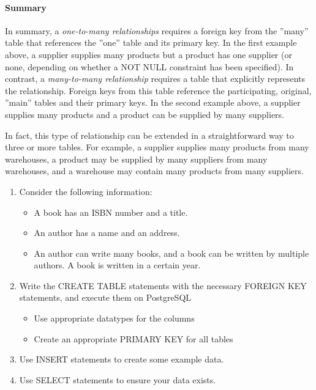 \paragraph*{Summary} In summary, a \emph{one-to-many relationships} requires a foreign key from the ''many'' table that references the ''one'' table and its primary key. In the first example above, a supplier supplies many products but a product has one supplier (or none, depending on whether a NOT NULL constraint has been specified). In contrast, a \emph{many-to-many relationship} requires a table that explicitly represents the relationship. Foreign keys from this table reference the participating, original, ''main'' tables and their primary keys. In the second example above, a supplier supplies many products and a product can be supplied by many suppliers. 

In fact, this type of relationship can be extended in a straightforward way to three or more tables. For example, a supplier supplies many products from many warehouses, a product may be supplied by many suppliers from many warehouses, and a warehouse may contain many products from many suppliers. 

\begin{exercisebox}
\begin{enumerate}
  \item Consider the following information:
	\begin{itemize}
	  \item A book has an ISBN number and a title. 
	  \item An author has a name and an address. 
	  \item An author can write many books, and a book can be written by multiple authors. A book is written in a certain year.
	\end{itemize}
  \item Write the CREATE TABLE statements with the necessary FOREIGN KEY statements, and execute them on PostgreSQL
  \begin{itemize}
    \item Use appropriate datatypes for the columns
    \item Create an appropriate PRIMARY KEY for all tables
  \end{itemize}
  \item Use INSERT statements to create some example data.
  \item Use SELECT statements to ensure your data exists.
\end{enumerate}
\end{exercisebox}

